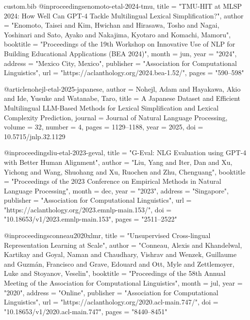 \begin{filecontents*}[overwrite]{custom.bib}
@inproceedings{enomoto-etal-2024-tmu,
    title = "{TMU}-{HIT} at {MLSP} 2024: How Well Can {GPT}-4 Tackle Multilingual Lexical Simplification?",
    author = "Enomoto, Taisei  and
      Kim, Hwichan  and
      Hirasawa, Tosho  and
      Nagai, Yoshinari  and
      Sato, Ayako  and
      Nakajima, Kyotaro  and
      Komachi, Mamoru",
    booktitle = "Proceedings of the 19th Workshop on Innovative Use of NLP for Building Educational Applications (BEA 2024)",
    month = jun,
    year = "2024",
    address = "Mexico City, Mexico",
    publisher = "Association for Computational Linguistics",
    url = "https://aclanthology.org/2024.bea-1.52/",
    pages = "590--598"
}

@article{nohejl-etal-2025-japanese,
    author  = {Nohejl, Adam and Hayakawa, Akio and Ide, Yusuke and Watanabe, Taro},
    title   = {A {J}apanese Dataset and Efficient Multilingual {LLM}-Based Methods for Lexical Simplification and Lexical Complexity Prediction},
    journal = {Journal of Natural Language Processing},
    volume  = {32},
    number  = {4},
    pages   = {1129--1188},
    year    = {2025},
    doi     = {10.5715/jnlp.32.1129}
}

@inproceedings{liu-etal-2023-geval,
    title     = "{G}-{E}val: {NLG} Evaluation using {GPT}-4 with Better Human Alignment",
    author    = "Liu, Yang  and
      Iter, Dan  and
      Xu, Yichong  and
      Wang, Shuohang  and
      Xu, Ruochen  and
      Zhu, Chenguang",
    booktitle = "Proceedings of the 2023 Conference on Empirical Methods in Natural Language Processing",
    month     = dec,
    year      = "2023",
    address   = "Singapore",
    publisher = "Association for Computational Linguistics",
    url       = "https://aclanthology.org/2023.emnlp-main.153/",
    doi       = "10.18653/v1/2023.emnlp-main.153",
    pages     = "2511--2522"
}

@inproceedings{conneau2020xlmr,
    title     = "Unsupervised Cross-lingual Representation Learning at Scale",
    author    = "Conneau, Alexis  and
      Khandelwal, Kartikay  and
      Goyal, Naman  and
      Chaudhary, Vishrav  and
      Wenzek, Guillaume  and
      Guzm{\'a}n, Francisco  and
      Grave, Edouard  and
      Ott, Myle  and
      Zettlemoyer, Luke  and
      Stoyanov, Veselin",
    booktitle = "Proceedings of the 58th Annual Meeting of the Association for Computational Linguistics",
    month     = jul,
    year      = "2020",
    address   = "Online",
    publisher = "Association for Computational Linguistics",
    url       = "https://aclanthology.org/2020.acl-main.747/",
    doi       = "10.18653/v1/2020.acl-main.747",
    pages     = "8440--8451"
}


\end{filecontents*}
